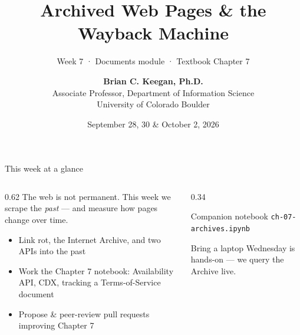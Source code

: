 \documentclass[9pt,aspectratio=169]{beamer}
\title[Week 7 · Web Archives]{{\Huge Archived Web Pages \& the Wayback Machine}}
\subtitle{Week 7 · Documents module · Textbook Chapter 7}
\author[Keegan]{\textbf{Brian C. Keegan, Ph.D.} \\ Associate Professor, Department of Information Science \\ University of Colorado Boulder}
\date{September 28, 30 \& October 2, 2026}
\begin{document}
\maketitle

\begin{frame}{This week at a glance}
    \begin{columns}[T]
        \begin{column}{0.62\textwidth}
            The web is not permanent. This week we scrape the \textit{past} --- and measure how pages change over time.

            \vspace{1em}

            \begin{itemize}\small
                \item Link rot, the Internet Archive, and two APIs into the past
            \end{itemize}

            \vspace{0.5em}

            \begin{itemize}\small
                \item Work the Chapter 7 notebook: Availability API, CDX, tracking a Terms-of-Service document
            \end{itemize}

            \vspace{0.5em}

            \begin{itemize}\small
                \item Propose \& peer-review pull requests improving Chapter 7
            \end{itemize}
        \end{column}
        \begin{column}{0.34\textwidth}
            \begin{block}{Companion notebook}
                \footnotesize \texttt{ch-07-archives.ipynb}
            \end{block}
            \begin{alertblock}{Bring a laptop}
                \footnotesize Wednesday is hands-on --- we query the Archive live.
            \end{alertblock}
        \end{column}
    \end{columns}
\end{frame}
\end{document}
